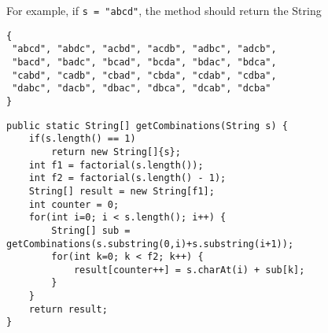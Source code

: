 \begin{questions}
For example, if \texttt{s = "abcd"}, the method should return the String

\begin{verbatim}
{
 "abcd", "abdc", "acbd", "acdb", "adbc", "adcb", 
 "bacd", "badc", "bcad", "bcda", "bdac", "bdca", 
 "cabd", "cadb", "cbad", "cbda", "cdab", "cdba", 
 "dabc", "dacb", "dbac", "dbca", "dcab", "dcba"
}
\end{verbatim}

\ifprintanswers
\begin{lstlisting}
public static String[] getCombinations(String s) {
	if(s.length() == 1)
		return new String[]{s};
	int f1 = factorial(s.length());
	int f2 = factorial(s.length() - 1);
	String[] result = new String[f1];
	int counter = 0;
	for(int i=0; i < s.length(); i++) {
		String[] sub = getCombinations(s.substring(0,i)+s.substring(i+1));
		for(int k=0; k < f2; k++) {
			result[counter++] = s.charAt(i) + sub[k];
		}
	}
	return result;
}	
\end{lstlisting}
\else
\fi
	
\end{questions}


